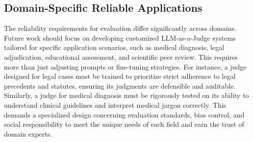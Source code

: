 \subsection{Domain-Specific Reliable Applications}\label{subsec:future_domain}

The reliability requirements for evaluation differ significantly across domains. Future work should focus on developing customized LLM-as-a-Judge systems tailored for specific application scenarios, such as medical diagnosis, legal adjudication, educational assessment, and scientific peer review. This requires more than just adjusting prompts or fine-tuning strategies. For instance, a judge designed for legal cases must be trained to prioritize strict adherence to legal precedents and statutes, ensuring its judgments are defensible and auditable. Similarly, a judge for medical diagnosis must be rigorously tested on its ability to understand clinical guidelines and interpret medical jargon correctly. This demands a specialized design concerning evaluation standards, bias control, and social responsibility to meet the unique needs of each field and earn the trust of domain experts.












